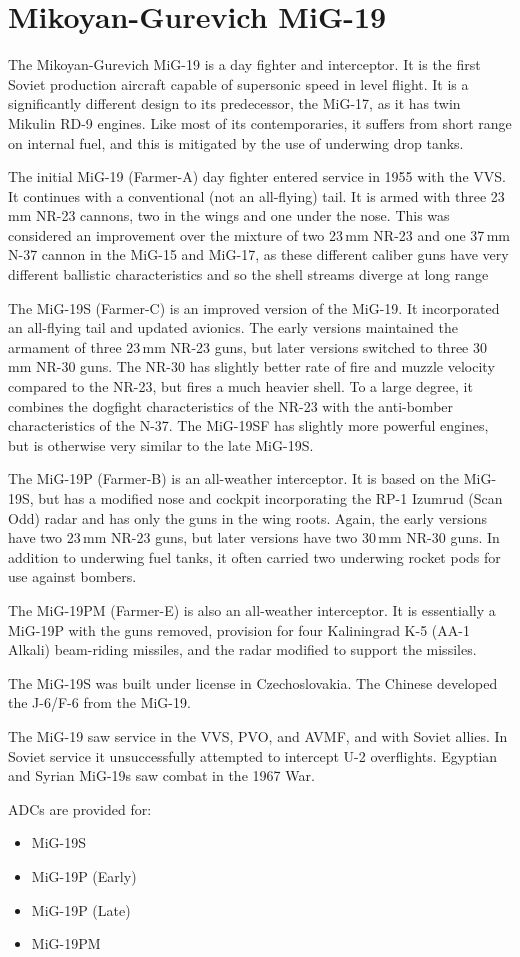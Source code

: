 \section*{Mikoyan-Gurevich MiG-19}

The Mikoyan-Gurevich MiG-19 is a day fighter and interceptor. It is the first Soviet production aircraft capable of supersonic speed in level flight. It is a significantly different design to its predecessor, the MiG-17, as it has twin Mikulin RD-9 engines. Like most of its contemporaries, it suffers from short range on internal fuel, and this is mitigated by the use of underwing drop tanks.

The initial MiG-19 (Farmer-A) day fighter entered service in 1955 with the VVS. It continues with a conventional (not an all-flying) tail. It is armed with three 23\,mm NR-23 cannons, two in the wings and one under the nose. This was considered an improvement over the mixture of two 23\,mm NR-23 and one 37\,mm N-37 cannon in the MiG-15 and MiG-17, as these different caliber guns have very different ballistic characteristics and so the shell streams diverge at long range

The MiG-19S (Farmer-C) is an improved version of the MiG-19. It incorporated an all-flying tail and updated avionics. The early versions maintained the armament of three 23\,mm NR-23 guns, but later versions switched to three 30\,mm NR-30 guns. The NR-30 has slightly better rate of fire and muzzle velocity compared to the NR-23, but fires a much heavier shell. To a large degree, it combines the dogfight characteristics of the NR-23 with the anti-bomber characteristics of the N-37. The MiG-19SF has slightly more powerful engines, but is otherwise very similar to the late MiG-19S.

The MiG-19P (Farmer-B) is an all-weather interceptor. It is based on the MiG-19S, but has a modified nose and cockpit incorporating the RP-1 Izumrud (Scan Odd) radar and has only the guns in the wing roots. Again, the early versions have two 23\,mm NR-23 guns, but later versions have two 30\,mm NR-30 guns. In addition to underwing fuel tanks, it often carried two underwing rocket pods for use against bombers.

The MiG-19PM (Farmer-E) is also an all-weather interceptor. It is essentially a MiG-19P with the guns removed, provision for four Kaliningrad K-5 (AA-1 Alkali) beam-riding missiles, and the radar modified to support the missiles.

The MiG-19S was built under license in Czechoslovakia. The Chinese developed the J-6/F-6 from the MiG-19.

The MiG-19 saw service in the VVS, PVO, and AVMF, and with Soviet allies. In Soviet service it unsuccessfully attempted to intercept U-2 overflights. Egyptian and Syrian MiG-19s saw combat in the 1967 War. 

ADCs are provided for:
\begin{itemize}
    \item MiG-19S
    \item MiG-19P (Early)
    \item MiG-19P (Late)
    \item MiG-19PM
\end{itemize}